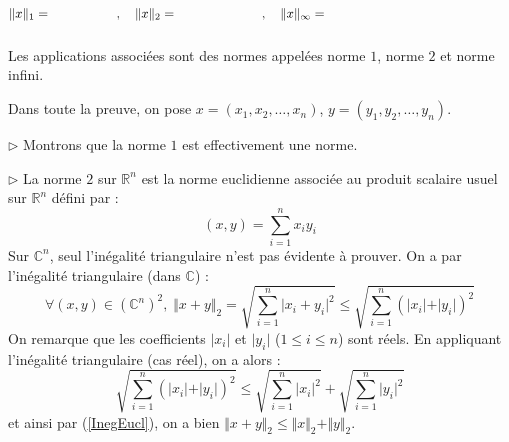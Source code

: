 \documentclass[french,11pt,twoside]{VcCours}
\begin{document}
$$\Vert x \Vert_1  = \phantom{\sum_{i=1}^n \vert x_i \vert} \qquad, \quad \Vert x \Vert_2  = \phantom{\sqrt{\sum_{i=1}^n \vert x_i \vert^2 }} \qquad, \quad \Vert x \Vert_{\infty}  = \phantom{\sup_{i \in \iii{1}{n}} \vert x_i \vert = \max_{i \in \iii{1}{n}} \vert x_i \vert }$$
Les applications associées sont des normes appelées norme $1$, norme $2$ et norme infini.

\medskip

\begin{Demonstration}{} Dans toute la preuve, on pose $x=(x_1, x_2, \ldots, x_n)$, $y=(y_1, y_2, \ldots,y_n)$.

\medskip

$\rhd$ Montrons que la norme $1$ est effectivement une norme. 


\vspace{11cm}
%

$\rhd$ La norme $2$ sur $\mathbb{R}^n$ est la norme euclidienne associée au produit scalaire usuel sur $\mathbb{R}^n$ défini par :
$$ (x,y) = \sum_{i=1}^n x_i y_i $$
Sur $\mathbb{C}^n$, seul l'inégalité triangulaire n'est pas évidente à prouver. On a par l'inégalité triangulaire (dans $\mathbb{C}$) :
\begin{equation}\label{InegEucl} \forall (x,y) \in (\mathbb{C}^n)^2, \; \Vert x+y \Vert_2 =  \sqrt{\sum_{i=1}^n \vert x_i+y_i \vert^2} \leq \sqrt{\sum_{i=1}^n (\vert x_i \vert + \vert y_i \vert)^2}
\end{equation}
On remarque que les coefficients $\vert x_i \vert$ et $\vert y_i \vert$ ($1 \leq i \leq n$) sont réels. En appliquant l'inégalité triangulaire (cas réel), on a alors :
$$ \sqrt{\sum_{i=1}^n (\vert x_i \vert + \vert y_i \vert)^2} \leq \sqrt{\sum_{i=1}^n \vert x_i \vert^2 } + \sqrt{\sum_{i=1}^n \vert y_i \vert^2 }$$
et ainsi par (\ref{InegEucl}), on a bien $\Vert x + y \Vert_2 \leq \Vert x  \Vert_2 + \Vert  y \Vert_2$.


\end{Demonstration}
\end{document}
